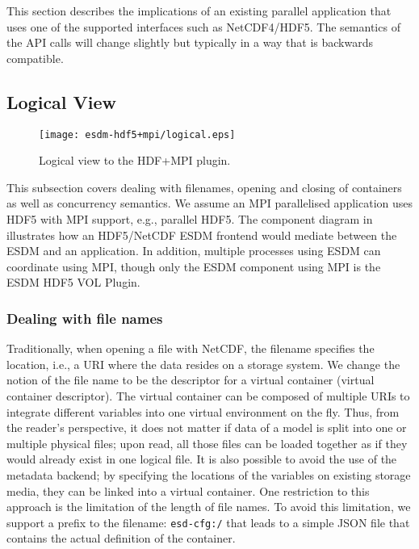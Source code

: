 This section describes the implications of an existing parallel application that uses one of the supported interfaces such as NetCDF4/HDF5.
The semantics of the API calls will change slightly but typically in a way that is backwards compatible.

\subsection{Logical View}


\begin{figure}
	\centering
	\texttt{[image: esdm-hdf5+mpi/logical.eps]}
	\caption{Logical view to the HDF+MPI plugin.}
	\label{fig:esdm hdf5 logical view}
\end{figure}

This subsection covers dealing with filenames, opening and closing of containers as well as concurrency semantics.
We assume an MPI parallelised application uses HDF5 with MPI support, e.g., parallel HDF5.
The component diagram in  illustrates how an HDF5/NetCDF ESDM frontend would mediate between the ESDM and an application.
In addition, multiple processes using ESDM can coordinate using MPI, though only the ESDM component using MPI is the ESDM HDF5 VOL Plugin.




\subsubsection{Dealing with file names}

Traditionally, when opening a file with NetCDF, the filename specifies the location, i.e., a URI where the data resides on a storage system.
We change the notion of the file name to be the descriptor for a virtual container (virtual container descriptor).
The virtual container can be composed of multiple URIs to integrate different variables into one virtual environment on the fly.
Thus, from the reader's perspective, it does not matter if data of a model is split into one or multiple physical files; upon read, all those files can be loaded together as if they would already exist in one logical file.
It is also possible to avoid the use of the metadata backend; by specifying the locations of the variables on existing storage media, they can be linked into a virtual container.
One restriction to this approach is the limitation of the length of file names.
To avoid this limitation, we support a prefix to the filename: \texttt{esd-cfg:/} that leads to a simple JSON file that contains the actual definition of the container.

